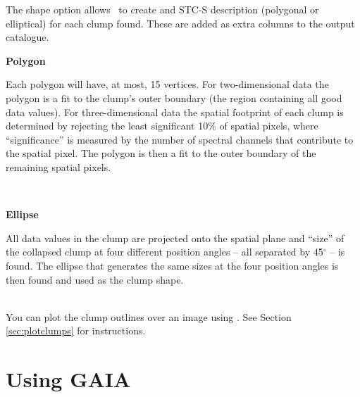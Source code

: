 \documentclass[11pt,oneside,chapters]{starlink}
\begin{document}
The shape option allows \findclumps\ to create and STC-S description
(polygonal or elliptical) for each clump found. These are added as
extra columns to the output catalogue.
\vspace{0.7cm}\\
\begin{minipage}[t]{0.12\linewidth}
\textbf{Polygon}
\end{minipage}
\begin{minipage}[t]{0.85\linewidth}
Each polygon will have, at most, 15 vertices. For two-dimensional data
the polygon is a fit to the clump's outer boundary (the region
containing all good data values). For three-dimensional data the
spatial footprint of each clump is determined by rejecting the least
significant 10\% of spatial pixels, where ``significance'' is measured
by the number of spectral channels that contribute to the spatial
pixel. The polygon is then a fit to the outer boundary of the
remaining spatial pixels.
\end{minipage}
\vspace{0.7cm}\\
\begin{minipage}[t]{0.12\linewidth}
\textbf{Ellipse}
\end{minipage}
\begin{minipage}[t]{0.85\linewidth}
All data values in the clump are projected onto the spatial plane and
``size'' of the collapsed clump at four different position angles --
all separated by 45$^\circ$ -- is found. The ellipse that generates
the same sizes at the four position angles is then found and used as
the clump shape.
\end{minipage}
\vspace{0.7cm}\\
You can plot the clump outlines over an image using \gaia. See Section
\ref{sec:plotclumps} for instructions.

\vspace{0.7cm}


\clearpage
\chapter{Using GAIA}
\label{sec:gaia}
\end{document}
